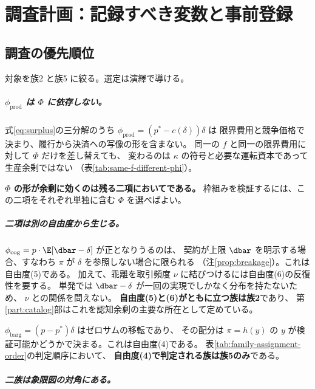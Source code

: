 \chapter{調査計画：記録すべき変数と事前登録}
\label{ch:next}

\section{調査の優先順位}

対象を族2 と族5 に絞る。選定は演繹で導ける。

\paragraph{$\phi_{\mathrm{prod}}$ は $\Phi$ に依存しない。}

式\eqref{eq:surplus}の三分解のうち $\phi_{\mathrm{prod}}=(p^{\ast}-c(\delta))\delta$ は
限界費用と競争価格で決まり、履行から決済への写像の形を含まない。
同一の $f$ と同一の限界費用に対して $\Phi$ だけを差し替えても、
変わるのは $\kappa$ の符号と必要な運転資本であって生産余剰ではない
（表\ref{tab:same-f-different-phi}）。

\textbf{$\Phi$ の形が余剰に効くのは残る二項においてである。}
枠組みを検証するには、この二項をそれぞれ単独に含む $\Phi$ を選べばよい。

\paragraph{二項は別の自由度から生じる。}

$\phi_{\mathrm{cog}}=p\cdot\E[\dbar-\delta]$ が正となりうるのは、
契約が上限 $\dbar$ を明示する場合、すなわち $\pi$ が $\delta$ を参照しない場合に限られる
（注\ref{prop:breakage}）。これは自由度(5)である。
加えて、乖離を取引頻度 $\nu$ に結びつけるには自由度(6)の反復性を要する。
単発では $\dbar-\delta$ が一回の実現でしかなく分布を持たないため、
$\nu$ との関係を問えない。
\textbf{自由度(5)と(6)がともに立つ族は族2}であり、
第\ref{part:catalog}部はこれを認知余剰の主要な所在として定めている。

$\phi_{\mathrm{barg}}=(p-p^{\ast})\delta$ はゼロサムの移転であり、
その配分は $\pi=h(y)$ の $y$ が検証可能かどうかで決まる。これは自由度(4)である。
表\ref{tab:family-assignment-order}の判定順序において、
\textbf{自由度(4)で判定される族は族5のみ}である。

\paragraph{二族は象限図の対角にある。}

